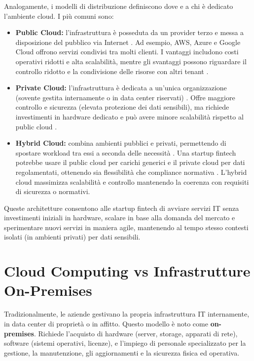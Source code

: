 Analogamente, i modelli di distribuzione definiscono dove e a chi è dedicato l’ambiente cloud. I più comuni sono:
\begin{itemize}
    \item \textbf{Public Cloud:} l’infrastruttura è posseduta da un provider terzo e messa a disposizione del pubblico via Internet \cite{geeksforgeeks_scalability}. Ad esempio, AWS, Azure e Google Cloud offrono servizi condivisi tra molti clienti. I vantaggi includono costi operativi ridotti e alta scalabilità, mentre gli svantaggi possono riguardare il controllo ridotto e la condivisione delle risorse con altri tenant \cite{geeksforgeeks_scalability}.
    \item \textbf{Private Cloud:} l’infrastruttura è dedicata a un’unica organizzazione (sovente gestita internamente o in data center riservati) \cite{geeksforgeeks_scalability}. Offre maggiore controllo e sicurezza (elevata protezione dei dati sensibili), ma richiede investimenti in hardware dedicato e può avere minore scalabilità rispetto al public cloud \cite{geeksforgeeks_scalability}.
    \item \textbf{Hybrid Cloud:} combina ambienti pubblici e privati, permettendo di spostare workload tra essi a seconda delle necessità \cite{geeksforgeeks_scalability}. Una startup fintech potrebbe usare il public cloud per carichi generici e il private cloud per dati regolamentati, ottenendo sia flessibilità che compliance normativa \cite{geeksforgeeks_scalability}. L’hybrid cloud massimizza scalabilità e controllo mantenendo la coerenza con requisiti di sicurezza o normativi.
\end{itemize}
Queste architetture consentono alle startup fintech di avviare servizi IT senza investimenti iniziali in hardware, scalare in base alla domanda del mercato e sperimentare nuovi servizi in maniera agile, mantenendo al tempo stesso contesti isolati (in ambienti privati) per dati sensibili.
\section{Cloud Computing vs Infrastrutture On-Premises}
\label{sec:cloud-vs-onprem}

Tradizionalmente, le aziende gestivano la propria infrastruttura IT internamente, in data center di proprietà o in affitto. Questo modello è noto come \textbf{on-premises}. Richiede l'acquisto di hardware (server, storage, apparati di rete), software (sistemi operativi, licenze), e l'impiego di personale specializzato per la gestione, la manutenzione, gli aggiornamenti e la sicurezza fisica ed operativa.

